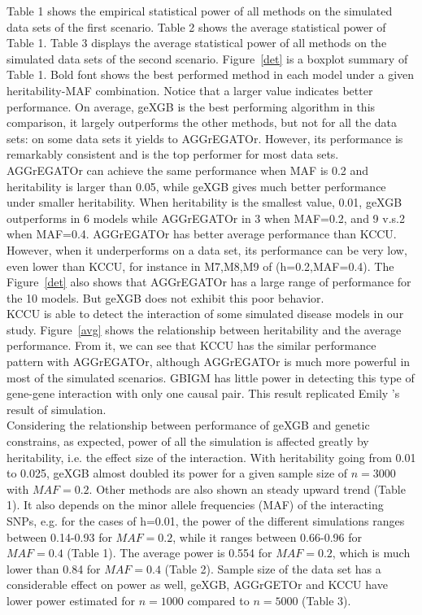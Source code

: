 \documentclass[11pt]{article}
\theoremstyle{plain}
\theoremstyle{definition}
\theoremstyle{remark}
\begin{document}
\noindent Table 1 shows the empirical statistical power of all methods on the simulated data sets of the first scenario. Table 2 shows the average statistical power of Table 1. Table 3 displays the average statistical power of all methods on the simulated data sets of the second scenario. Figure~\ref{det} is a boxplot summary of Table 1. Bold font shows the best performed method in each model under a given heritability-MAF combination. Notice that a larger value indicates better performance. On average, geXGB is the best performing algorithm in this comparison, it largely outperforms the other methods, but not for all the data sets: on some data sets it yields to AGGrEGATOr. However, its performance is remarkably consistent and is the top performer for most data sets. AGGrEGATOr can achieve the same performance when MAF is 0.2 and heritability is larger than 0.05, while geXGB gives much better performance under smaller heritability. When heritability is the smallest value, 0.01, geXGB outperforms in 6 models while AGGrEGATOr in 3 when MAF=0.2, and 9 v.s.2 when MAF=0.4. AGGrEGATOr has better average performance than KCCU. However, when it underperforms on a data set, its performance can be very low, even lower than KCCU, for instance in M7,M8,M9 of (h=0.2,MAF=0.4). The Figure~\ref{det} also shows that AGGrEGATOr has a large range of performance for the 10 models. But geXGB does not exhibit this poor behavior. \\

\noindent KCCU is able to detect the interaction of some simulated disease models in our study. Figure~\ref{avg} shows the relationship between heritability and the average performance. From it, we can see that KCCU has the similar performance pattern with AGGrEGATOr, although AGGrEGATOr is much more powerful in most of the simulated scenarios. GBIGM has little power in detecting this type of gene-gene interaction with only one causal pair. This result replicated Emily \cite{7}'s result of simulation. \\

\noindent Considering the relationship between performance of geXGB and genetic constrains, as expected, power of all the simulation is affected greatly by heritability, i.e. the effect size of the interaction. With heritability going from 0.01 to 0.025, geXGB almost doubled its power for a given sample size of $n=3000$ with $MAF=0.2$. Other methods are also shown an steady upward trend (Table 1). It also depends on the minor allele frequencies (MAF) of the interacting SNPs, e.g. for the cases of h=0.01, the power of the different simulations ranges between 0.14-0.93 for $MAF=0.2$, while it ranges between 0.66-0.96 for $MAF=0.4$ (Table 1). The average power is 0.554 for $MAF=0.2$, which is much lower than 0.84 for $MAF=0.4$ (Table 2). Sample size of the data set has a considerable effect on power as well, geXGB, AGGrGETOr and KCCU have lower power estimated for $n=1000$ compared to $n=5000$ (Table 3).
\end{document}
